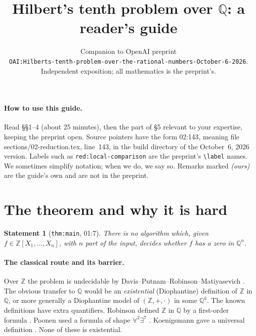 \documentclass[11pt]{article}
\title{Hilbert's tenth problem over $\mathbb Q$: a reader's guide}
\author{Companion to OpenAI preprint\\
\texttt{OAI:Hilberts-tenth-problem-over-the-rational-numbers-October-6-2026}.\\
Independent exposition; all mathematics is the preprint's.}
\date{}
\newtheorem*{statement}{Statement}
\theoremstyle{definition}
\newcommand{\Q}{\mathbb Q}
\newcommand{\Z}{\mathbb Z}
\newcommand{\lbl}[1]{\texttt{#1}}
\newcommand{\src}[1]{\textsf{#1}}
\begin{document}
\maketitle

\begin{center}
\end{center}

\paragraph{How to use this guide.}
Read \S\S1--4 (about 25 minutes), then the part of \S5 relevant to your
expertise, keeping the preprint open.  Source pointers have the form
\src{02:143}, meaning file \src{sections/02-reduction.tex}, line~143,
in the build directory of the October~6, 2026 version.  Labels such as
\lbl{red:local-comparison} are the preprint's \verb|\label| names.
We sometimes simplify notation; when we do, we say so.
Remarks marked \emph{(ours)} are the guide's own and are not in the preprint.

\tableofcontents

\section{The theorem and why it is hard}

\begin{statement}[\lbl{thm:main}, \src{01:7}]
There is no algorithm which, given $f\in\Z[X_1,\dots,X_n]$, with $n$ part
of the input, decides whether $f$ has a zero in $\Q^n$.
\end{statement}

\paragraph{The classical route and its barrier.}
Over $\Z$ the problem is undecidable by Davis--Putnam--Robinson--Matiyasevich
\cite{DavisPutnamRobinson1961,Matiyasevich1970}.  The obvious transfer to
$\Q$ would be an \emph{existential} (Diophantine) definition of $\Z$ in $\Q$,
or more generally a Diophantine model of $(\Z,+,\cdot)$ in some $\Q^k$.
The known definitions have extra quantifiers.  Robinson defined $\Z$ in
$\Q$ by a first-order formula \cite{Robinson1949}.  Poonen used a formula of
shape $\forall^2\exists^7$ \cite{Poonen2009}.  Koenigsmann gave a universal
definition \cite{Koenigsmann2016}.  None of these is existential.
\end{document}

